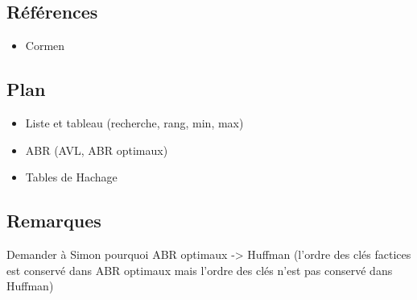 \documentclass[../../agregation.tex]{subfiles}
\begin{document}

\dvts

\subsection{Références}

\begin{itemize}
	\item Cormen
\end{itemize}

\subsection{Plan}

\begin{itemize}
	\item Liste et tableau (recherche, rang, min, max)
	\item ABR (AVL, ABR optimaux)
	\item Tables de Hachage
\end{itemize}

\subsection{Remarques}

Demander à Simon pourquoi ABR optimaux -> Huffman (l'ordre des clés factices est conservé dans ABR optimaux mais l'ordre des clés n'est pas conservé dans Huffman)
\end{document}
